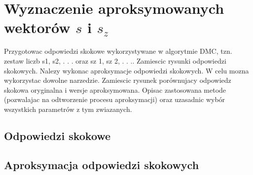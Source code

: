 \section{Wyznaczenie aproksymowanych wektorów $s$ i $s_z$ }

Przygotowac odpowiedzi skokowe wykorzystywane w algorytmie DMC, tzn. zestaw
liczb s1, s2, . . . oraz sz
1, sz
2, . . .. Zamiescic rysunki odpowiedzi skokowych. Nalezy wykonac
aproksymacje odpowiedzi skokowych. W celu mozna wykorzystac dowolne narzedzie.
Zamiescic rysunek porównujacy odpowiedz skokowa oryginalna i wersje aproksymowana.
Opisac zastosowana metode (pozwalajac na odtworzenie procesu aproksymacji)
oraz uzasadnic wybór wszystkich parametrów z tym zwiazanych.

\subsection{Odpowiedzi skokowe}

\subsection{Aproksymacja odpowiedzi skokowych}
